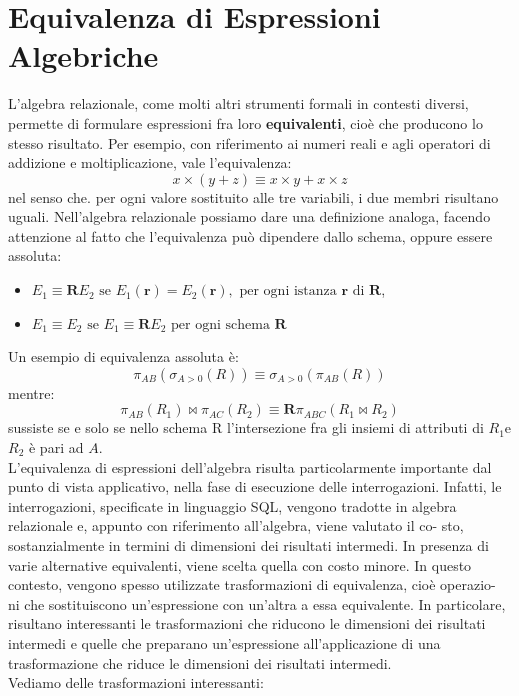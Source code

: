 \documentclass[a4paper,12pt, oneside]{book}
\begin{document}
\section{Equivalenza di Espressioni Algebriche}
L'algebra relazionale, come molti altri strumenti formali in contesti diversi, permette
di formulare espressioni fra loro \textbf{equivalenti}, cioè che producono lo stesso
risultato. Per esempio, con riferimento ai numeri reali e agli operatori di addizione
e moltiplicazione, vale l'equivalenza:
\[x \times(y+z) \equiv x \times y+x \times z\]
nel senso che. per ogni valore sostituito alle tre variabili, i due membri risultano
uguali. Nell'algebra relazionale possiamo dare una definizione analoga, facendo
attenzione al fatto che l'equivalenza può dipendere dallo schema, oppure essere
assoluta:
\begin{itemize}
\item $E_{1} \equiv \mathbf{R} E_{2} \text { se } E_{1}(\mathbf{r})=E_{2}(\mathbf{r}), \text { per ogni istanza } \mathbf{r} \text { di } \mathbf{R}$, 
\item $E_{1} \equiv E_{2} \text { se } E_{1} \equiv \mathbf{R} E_{2} \text { per ogni schema } \mathbf{R}$  
\end{itemize}
Un esempio di equivalenza assoluta è:
\[\pi_{A B}\left(\sigma_{A>0}(R)\right) \equiv \sigma_{A>0}\left(\pi_{A B}(R)\right)\]
mentre:
\[\pi_{AB}(R_1)\Join\pi_{AC}(R_2)\equiv \mathbf{R}\pi_{ABC}(R_1\Join R_2)\]
sussiste se e solo se nello schema R l'intersezione fra gli insiemi di attributi di $R_1$e $R_2$ è pari ad $A$.\\
L'equivalenza di espressioni dell'algebra risulta particolarmente importante
dal punto di vista applicativo, nella fase di esecuzione delle interrogazioni. Infatti,
le interrogazioni, specificate in linguaggio SQL, vengono tradotte in
algebra relazionale e, appunto con riferimento all'algebra, viene valutato il co-
sto, sostanzialmente in termini di dimensioni dei risultati intermedi. In presenza
di varie alternative equivalenti, viene scelta quella con costo minore. In questo
contesto, vengono spesso utilizzate trasformazioni di equivalenza, cioè operazio-
ni che sostituiscono un'espressione con un'altra a essa equivalente. In particolare,
risultano interessanti le trasformazioni che riducono le dimensioni dei risultati
intermedi e quelle che preparano un'espressione all'applicazione di una trasformazione
che riduce le dimensioni dei risultati intermedi.\\
Vediamo delle trasformazioni interessanti:
\end{document}
